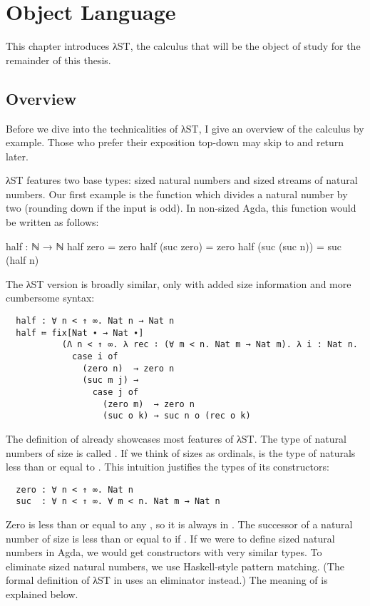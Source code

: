 \chapter{Object Language}
\label{sec:source}

This chapter introduces λST, the calculus that will be the object of study for
the remainder of this thesis.


\section{Overview}
\label{sec:source:overview}

Before we dive into the technicalities of λST, I give an overview of the
calculus by example. Those who prefer their exposition top-down may skip to
 and return later.

λST features two base types: sized natural numbers and sized streams of natural
numbers. Our first example is the function  which divides a natural
number by two (rounding down if the input is odd). In non-sized Agda, this
function would be written as follows:
\begin{code}
  half : ℕ → ℕ
  half zero = zero
  half (suc zero) = zero
  half (suc (suc n)) = suc (half n)
\end{code}
The λST version is broadly similar, only with added size information and more
cumbersome syntax:
\begin{verbatim}
  half : ∀ n < ↑ ∞. Nat n → Nat n
  half ≔ fix[Nat ∙ → Nat ∙]
           (Λ n < ↑ ∞. λ rec ∶ (∀ m < n. Nat m → Nat m). λ i : Nat n.
             case i of
               (zero n)  → zero n
               (suc m j) →
                 case j of
                   (zero m)  → zero n
                   (suc o k) → suc n o (rec o k)
\end{verbatim}

The definition of  already showcases most features of λST. The type
of natural numbers of size  is called . If we think of
sizes as ordinals,  is the type of naturals less than or equal to
. This intuition justifies the types of its constructors:
\begin{verbatim}
  zero : ∀ n < ↑ ∞. Nat n
  suc  : ∀ n < ↑ ∞. ∀ m < n. Nat m → Nat n
\end{verbatim}
Zero is less than or equal to any , so it is always in .
The successor of a natural number  of size  is less than or
equal to  if . If we were to define sized natural numbers
in Agda, we would get constructors with very similar types. To eliminate sized
natural numbers, we use Haskell-style pattern matching. (The formal definition
of λST in  uses an eliminator instead.) The meaning of
 is explained below.

